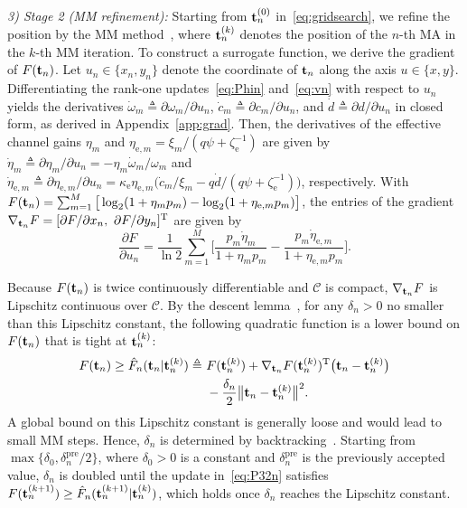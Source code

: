 \documentclass[journal]{IEEEtran}
\begin{document}
\textit{3) Stage 2 (MM refinement):} Starting from $\mathbf{t}_n^{(0)}$ in~\eqref{eq:gridsearch}, we refine the position by the MM method~\cite{Sun2017}, where $\mathbf{t}_n^{(k)}$ denotes the position of the $n$-th MA in the $k$-th MM iteration. To construct a surrogate function, we derive the gradient of $F(\mathbf{t}_n)$. Let $u_n\in\{x_n,y_n\}$ denote the coordinate of $\mathbf{t}_n$ along the axis $u\in\{x,y\}$. Differentiating the rank-one updates~\eqref{eq:Phin} and~\eqref{eq:vn} with respect to $u_n$ yields the derivatives $\dot\omega_m\triangleq\partial\omega_m/\partial u_n$, $\dot c_m\triangleq\partial c_m/\partial u_n$, and $\dot d\triangleq\partial d/\partial u_n$ in closed form, as derived in Appendix~\ref{app:grad}. Then, the derivatives of the effective channel gains $\eta_m$ and $\eta_{\mathrm{e},m}=\xi_m/(q\psi+\zeta_{\mathrm e}^{-1})$ are given by $\dot\eta_m\triangleq\partial\eta_m/\partial u_n=-\eta_m\dot\omega_m/\omega_m$ and $\dot\eta_{\mathrm{e},m}\triangleq\partial\eta_{\mathrm{e},m}/\partial u_n=\kappa_{\mathrm e}\eta_{\mathrm{e},m}\big(\dot c_m/\xi_m-q\dot d/(q\psi+\zeta_{\mathrm e}^{-1})\big)$, respectively. With $F(\mathbf{t}_n)=\sum_{m=1}^M\big[\log_2(1+\eta_mp_m)-\log_2(1+\eta_{\mathrm{e},m}p_m)\big]$, the entries of the gradient $\nabla_{\mathbf{t}_n}F=[\partial F/\partial x_n,\ \partial F/\partial y_n]^{\mathrm T}$ are given by
\begin{equation}\label{eq:dF}
\frac{\partial F}{\partial u_n}=\frac{1}{\ln2}\sum_{m=1}^{M}\bigg[\frac{p_m\dot\eta_m}{1+\eta_mp_m}-\frac{p_m\dot\eta_{\mathrm{e},m}}{1+\eta_{\mathrm{e},m}p_m}\bigg].
\end{equation}

Because $F(\mathbf{t}_n)$ is twice continuously differentiable and $\mathcal C$ is compact, $\nabla_{\mathbf{t}_n}F$ is Lipschitz continuous over $\mathcal C$. By the descent lemma~\cite[Lemma~5.7]{Beck2017}, for any $\delta_n>0$ no smaller than this Lipschitz constant, the following quadratic function is a lower bound on $F(\mathbf{t}_n)$ that is tight at $\mathbf{t}_n^{(k)}$:
\begin{align}
F(\bt_n)\ge\hat F_n(\bt_n|\bt_n^{(k)})\triangleq\ &F(\bt_n^{(k)})+\nabla_{\bt_n}F(\bt_n^{(k)})^{\mathrm T}\big(\bt_n-\bt_n^{(k)}\big)\nonumber\\
&-\frac{\delta_n}{2}\big\|\bt_n-\bt_n^{(k)}\big\|^2.\label{eq:surrogate}
\end{align}
A global bound on this Lipschitz constant is generally loose and would lead to small MM steps. Hence, $\delta_n$ is determined by backtracking~\cite{Beck2017}. Starting from $\max\{\delta_0,\delta_n^{\mathrm{pre}}/2\}$, where $\delta_0>0$ is a constant and $\delta_n^{\mathrm{pre}}$ is the previously accepted value, $\delta_n$ is doubled until the update in~\eqref{eq:P32n} satisfies $F(\mathbf{t}_n^{(k+1)})\ge\hat F_n(\mathbf{t}_n^{(k+1)}|\mathbf{t}_n^{(k)})$, which holds once $\delta_n$ reaches the Lipschitz constant.
\end{document}
